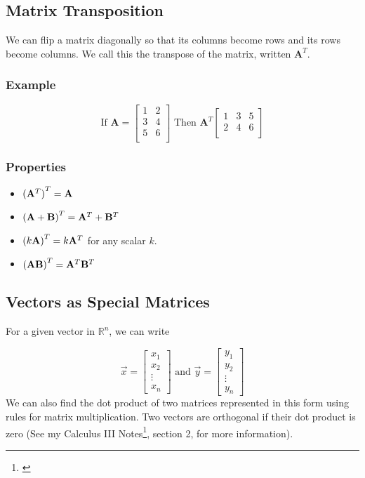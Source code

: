     \subsection{Matrix Transposition}
    We can flip a matrix diagonally so that its columns become rows and its rows become columns. We call this the transpose of the matrix, written $\mathbf{A}^T$.

        \subsubsection{Example}
        \[
        \text{If } \mathbf{A} = \left[ \begin{array}{cc}
            1 & 2\\
            3 & 4\\
            5 & 6\\
        \end{array} \right] \text{ Then } \mathbf{A}^T
        \left[ \begin{array}{ccc}
            1 & 3 & 5\\
            2 & 4 & 6\\
        \end{array} \right]
        \]

        \subsubsection{Properties}
        \begin{itemize}
            \item ${(\mathbf{A}^T)}^T = \mathbf{A}$
            \item ${(\mathbf{A} + \mathbf{B})}^T = \mathbf{A}^T + \mathbf{B}^T$
            \item ${(k \mathbf{A})}^T = k\mathbf{A}^T$ for any scalar $k$.
            \item ${(\mathbf{A} \mathbf{B})}^T = \mathbf{A}^T \mathbf{B}^T$
        \end{itemize}

    \subsection{Vectors as Special Matrices}
    For a given vector in $\mathbb{R}^n$, we can write

    \[
        \vec{x} =
        \left[\begin{matrix}
        x_1\\
        x_2\\
        \vdots\\
        x_n
        \end{matrix}\right] \text{ and }
        \vec{y} =
        \left[\begin{matrix}
        y_1\\
        y_2\\
        \vdots\\
        y_n
        \end{matrix}\right]
    \]
    We can also find the dot product of two matrices represented in this form using rules for matrix multiplication. Two vectors are orthogonal if their dot product is zero (See my Calculus III Notes\footnote{\label{doc:calcIII}}, section 2, for more information).

